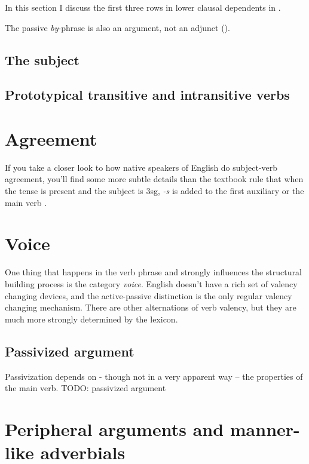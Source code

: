 \documentclass[UTF8, a4paper, oneside, scheme=plain, 12pt]{ctexbook}
\newcommand*{\citesec}[1]{\S~{#1}}
\newcommand*{\citechap}[1]{Ch.~{#1}}
\newcommand{\form}[1]{\emph{#1}}
\begin{document}
In this section I discuss the first three rows in 
lower clausal dependents in .

The passive \form{by}-phrase is also an argument, not an adjunct 
().





\subsection{The subject}\label{sec:subject}

\subsection{Prototypical transitive and intransitive verbs}


\section{Agreement}

If you take a closer look to how native speakers of English do subject-verb agreement,
you'll find some more subtle details than 
the textbook rule that when the tense is \acl{present}
and the subject is 3sg, 
\form{-s} is added to the first auxiliary or the main verb
\citep[\citechap{5}, \citesec{18}]{cgel}.

\section{Voice} 

One thing that happens in the verb phrase 
and strongly influences the structural building process is the category \emph{voice}.
English doesn't have a rich set of valency changing devices,
and the active-passive distinction is the only regular valency changing mechanism.
There are other alternations of verb valency,
but they are much more strongly determined by the lexicon. 

\subsection{Passivized argument}

Passivization depends on - though not in a very apparent way -- the properties of the main verb. 
TODO: passivized argument

\section{Peripheral arguments and manner-like adverbials}\label{sec:vp.peripheral}
\end{document}
